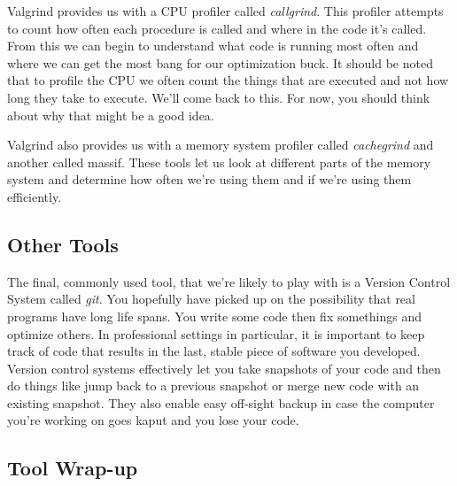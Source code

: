 \documentclass[]{tufte-handout}
\begin{document}
Valgrind provides us with a CPU profiler called \textit{callgrind}. This profiler attempts to count how often each procedure is called and where in the code it's called.  From this we can begin to understand what code is running most often and where we can get the most bang for our optimization buck.  It should be noted that to profile the CPU we often count the things that are executed and not how long they take to execute.  We'll come back to this. For now, you should think about why that might be a good idea.  

Valgrind also provides us with a memory system profiler called \textit{cachegrind} and another called {massif}.  These tools let us look at different parts of the memory system and determine how often we're using them and if we're using them efficiently.       

\subsection{Other Tools}

The final, commonly used tool, that we're likely to play with is a Version Control System called \textit{git}. You hopefully have picked up on the possibility that real programs have long life spans.  You write some code then fix somethings and optimize others.  In professional settings in particular, it is important to keep track of code that results in the last, stable piece of software you developed.  Version control systems effectively let you take snapshots of your code and then do things like jump back to a previous snapshot or merge new code with an existing snapshot.  They also enable easy off-sight backup in case the computer you're working on goes kaput and you lose your code.

\subsection{Tool Wrap-up}
\end{document}
